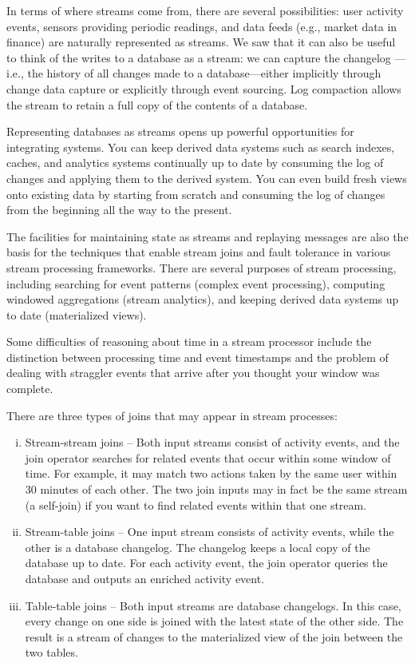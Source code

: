 \documentclass{article}
\begin{document}
    In terms of where streams come from, there are several possibilities: user activity events, sensors providing periodic readings, and data feeds (e.g., market data in finance) are naturally represented as streams. We saw that it can also be useful to think of the writes to a database as a stream: we can capture the changelog — i.e., the history of all changes made to a database—either implicitly through change data capture or explicitly through event sourcing. Log compaction allows the stream to retain a full copy of the contents of a database.

    Representing databases as streams opens up powerful opportunities for integrating systems. You can keep derived data systems such as search indexes, caches, and analytics systems continually up to date by consuming the log of changes and applying them to the derived system. You can even build fresh views onto existing data by starting from scratch and consuming the log of changes from the beginning all the way to the present.

    The facilities for maintaining state as streams and replaying messages are also the basis for the techniques that enable stream joins and fault tolerance in various stream processing frameworks. There are several purposes of stream processing, including searching for event patterns (complex event processing), computing windowed aggregations (stream analytics), and keeping derived data systems up to date (materialized views).
    
    Some difficulties of reasoning about time in a stream processor include the distinction between processing time and event timestamps and the problem of dealing with straggler events that arrive after you thought your window was complete.

    There are three types of joins that may appear in stream processes:
    \begin{enumerate}[i.]
        \item Stream-stream joins -- Both input streams consist of activity events, and the join operator searches for related events that occur within some window of time. For example, it may match two actions taken by the same user within 30 minutes of each other. The two join inputs may in fact be the same stream (a self-join) if you want to find related events within that one stream.
        
        \item Stream-table joins -- One input stream consists of activity events, while the other is a database changelog. The changelog keeps a local copy of the database up to date. For each activity event, the join operator queries the database and outputs an enriched activity event.
        
        \item Table-table joins -- Both input streams are database changelogs. In this case, every change on one side is joined with the latest state of the other side. The result is a stream of changes to the materialized view of the join between the two tables.
    \end{enumerate}
    
\end{document}
